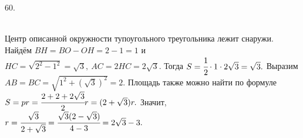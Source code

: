 60. \begin{figure}[ht!]
\end{figure}\\
Центр описанной окружности тупоугольного треугольника лежит снаружи. Найдём $BH=BO-OH=2-1=1$ и $HC=\sqrt{2^2-1^2}=\sqrt{3},\ AC=2HC=2\sqrt{3}.$ Тогда $S=\cfrac{1}{2}\cdot1\cdot2\sqrt{3}=\sqrt{3}.$ Выразим $AB=BC=\sqrt{1^2+(\sqrt{3})^2}=2.$ Площадь также можно найти по формуле $S=pr=\cfrac{2+2+2\sqrt{3}}{2}r=(2+\sqrt{3})r.$ Значит, $r=\cfrac{\sqrt{3}}{2+\sqrt{3}}=\cfrac{\sqrt{3}(2-\sqrt{3})}{4-3}=2\sqrt{3}-3.$\\
